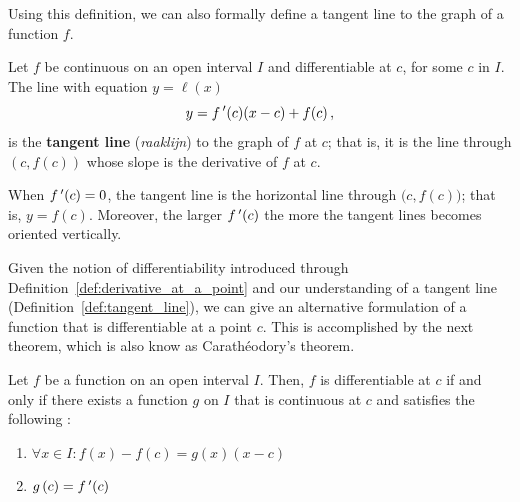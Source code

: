 Using this definition, we can also formally define a tangent line to the graph of a function $f$.

\begin{definition}\label{def:tangent_line}
Let $f$ be continuous on an open interval $I$ and differentiable at $c$, for some $c$ in $I$. The line with equation $y=\ell(x)$
$$
y = f\,'(c)(x-c)+f(c)\,,
$$ 
is the \textbf{tangent line} (\textit{raaklijn}) to the graph of $f$ at $c$; that is, it is the line through $(c,f(c))$ whose slope is the derivative of $f$ at $c$.
\end{definition}
 When $f\,'(c)=0$, the tangent line is the horizontal line through $\big(c,f(c)\big)$; that is, $y=f(c)$. Moreover, the larger $f\,'(c)$ the more the tangent lines becomes oriented vertically. 





\ifcourse
\ifanalysis

Given the notion of differentiability introduced through Definition~\ref{def:derivative_at_a_point}  and our understanding of a tangent line (Definition~\ref{def:tangent_line}), we can give an alternative formulation of a function  that is differentiable at a point $c$. This is accomplished by the next theorem, which is also know as Carath\'{e}odory's theorem.

\begin{theorem}
\label{Caratheodory}
Let $f$ be a function on an open interval $I$. Then,  $f$ is differentiable at $c$ if and only if there exists a function $g$ on $I$ that is continuous at $c$ and satisfies the following :
\begin{enumerate}
\item $\forall x \in I: f \left({x}\right) - f \left({c}\right) = g \left({x}\right) \left({x - c}\right)$
\item $g\left({c}\right) = f\,'(c)$
\end{enumerate}
\end{theorem}

